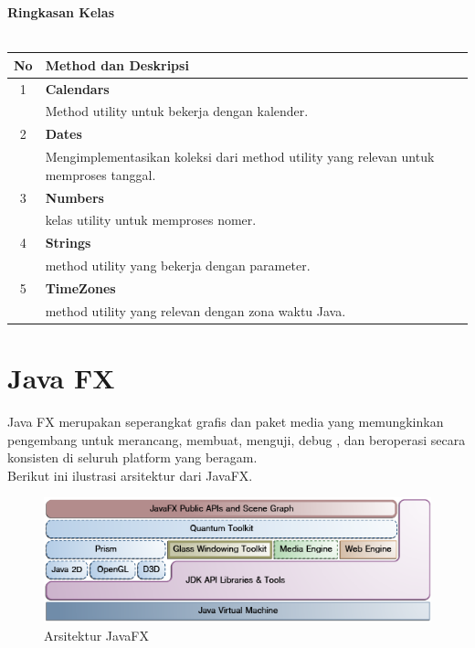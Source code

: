	\noindent \textbf{Ringkasan Kelas}\cite{ical}\\ \\
	\begin{tabular}{|c|p{12cm}|}
		\hline
		\textbf{No} & \textbf{Method dan Deskripsi} \\ \hline \hline
		1 & \textbf{Calendars}\\
			&	Method utility untuk bekerja dengan kalender.\\ \hline
		2 & \textbf{Dates}\\
			&	Mengimplementasikan koleksi dari method utility yang relevan untuk memproses tanggal. \\ \hline
		3 & \textbf{Numbers}\\
			&	kelas utility untuk memproses nomer. \\ \hline
		4 & \textbf{Strings}\\
			&	method utility yang bekerja dengan parameter. \\ \hline
		5 & \textbf{TimeZones}\\
			&	method utility yang relevan dengan zona waktu Java. \\ \hline
		\end{tabular}

\section{Java FX}
Java FX merupakan seperangkat grafis dan paket media yang memungkinkan pengembang untuk merancang, membuat, menguji, debug , dan  beroperasi secara konsisten di seluruh platform yang beragam\cite{javafx2}.\\
Berikut ini ilustrasi arsitektur dari JavaFX.
\begin{figure}[H]
	\centering
	\includegraphics[scale=0.7]{Gambar/arsitekturJavaFX}
	\caption{Arsitektur JavaFX}
	\end{figure}
	
